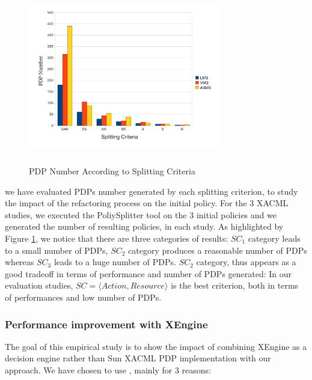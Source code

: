 \begin{figure}[!h]
  \centering
\includegraphics[width=8.5cm, height=7.5cm]{pdpnumber.pdf}
\begin{center}
\caption{PDP Number According to Splitting Criteria}
\label{pdpnumber}
\end{center}
\end{figure} 

we have evaluated PDPs number generated by each splitting criterion, to study the impact of the refactoring process on the initial policy. 
For the 3 XACML studies, we executed the PoliySplitter tool on the 3 initial policies and we generated the number of resulting policies, in each study. 
As highlighted by Figure \ref{pdpnumber}, we notice that there are three
 categories of results: $SC_{1}$ category leads to a small number of PDPs, $SC_{2}$ category produces a reasonable number of PDPs whereas $SC_{3}$ leads to a huge 
number of PDPs. $SC_{2}$ category, thus appears as a good tradeoff in terms of performance and number of 
PDPs generated: In our evaluation studies, $SC=\langle Action, Resource\rangle$ is the best criterion, both in terms of performances and low number of PDPs.


\subsubsection{Performance improvement with XEngine}
The goal of this empirical study is to show the impact of combining XEngine as a decision engine rather than Sun XACML PDP implementation with our approach. 
We have chosen to use \cite{Xengine}, mainly for 3 reasons:

